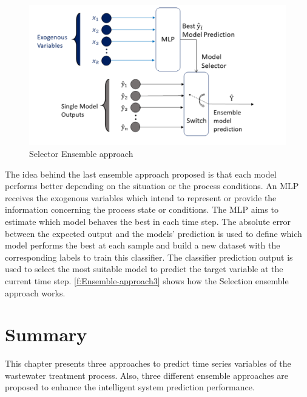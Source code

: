 \begin{figure}[h]
\centering
\includegraphics[width=\linewidth]{figures/Ch4/Ensemble_Approach3.pdf}
\caption{Selector Ensemble approach}
\label{f:Ensemble-approach3}
\end{figure}

The idea behind the last ensemble approach proposed is that each model performs better depending on the situation or the process conditions. An \ac{MLP} receives the exogenous variables which intend to represent or provide the information concerning the process state or conditions. The \ac{MLP} aims to estimate which model behaves the best in each time step. The absolute error between the expected output and the models' prediction is used to define which model performs the best at each sample and build a new dataset with the corresponding labels to train this classifier. 
The classifier prediction output is used to select the most suitable model to predict the target variable at the current time step. \autoref{f:Ensemble-approach3} shows how the Selection ensemble approach works.

\section{Summary}

\label{s:Contribution-1-Summary}

This chapter presents three approaches to predict time series variables of the wastewater treatment process. Also, three different ensemble approaches are proposed to enhance the intelligent system prediction performance.